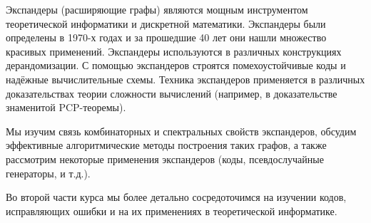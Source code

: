 Экспандеры (расширяющие графы) являются мощным инструментом теоретической информатики и дискретной
математики. Экспандеры были определены в 1970-х годах и за прошедшие 40 лет они нашли множество красивых
применений. Экспандеры используются в различных конструкциях дерандомизации. С помощью экспандеров
строятся помехоустойчивые коды и надёжные вычислительные схемы. Техника экспандеров применяется в
различных доказательствах теории сложности вычислений (например, в доказательстве знаменитой
PCP-теоремы).

Мы изучим связь комбинаторных и спектральных свойств экспандеров, обсудим эффективные алгоритмические
методы построения таких графов, а также рассмотрим некоторые применения экспандеров (коды,
псевдослучайные генераторы, и т.д.).

Во второй части курса мы более детально сосредоточимся на изучении кодов, исправляющих ошибки и на их
применениях в теоретической информатике.